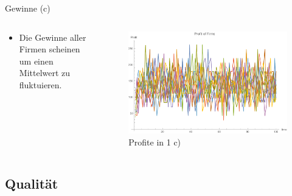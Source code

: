 \documentclass[xcolor={dvipsnames},10pt]{beamer}
\begin{document}
\begin{frame}{Gewinne (c)}
\begin{columns}[T]
    \begin{column}{.3\textwidth}
      \begin{itemize}
      \item Die Gewinne aller Firmen scheinen um einen Mittelwert zu fluktuieren.
      \end{itemize}
      \end{column}
      \begin{column}{.7\textwidth}
      \begin{figure}[t]
            \centering
            \includegraphics[scale=0.35]{../Plots/profit1c}
            \caption{Profite in 1 c)}
            \label{fig:profit1c}
       \end{figure}
    \end{column}
  \end{columns}
\end{frame}


\subsection{Qualität}
\end{document}
